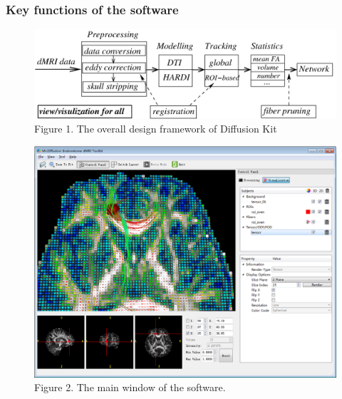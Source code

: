 \documentclass[letterpaper,10pt,english]{sphinxmanual}
\begin{document}
\subsubsection{Key functions of the software}
\label{overview:key-functions-of-the-software}\begin{figure}[htbp]
\centering
\capstart

\includegraphics{overall.png}
\caption{Figure 1. The overall design framework of Diffusion Kit}\end{figure}
\begin{figure}[htbp]
\centering
\capstart

\includegraphics{mainwindow.png}
\caption{Figure 2. The main window of the software.}\end{figure}
\end{document}
